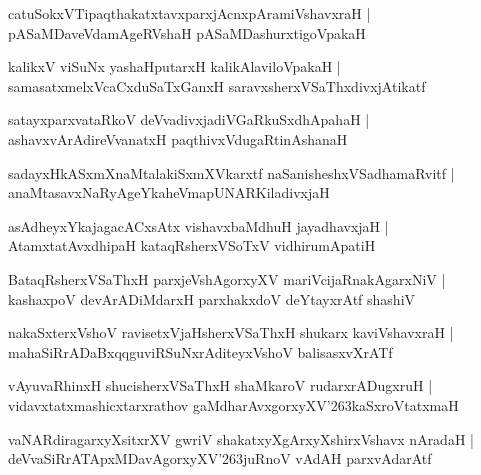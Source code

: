 \documentclass[twoside,12pt,openright]{book}
\def\S{\char'263}
\newcounter{shloka}[chapter]
\begin{document}
\begin{shloka}%
catuSokxVTipaqthakatxtavxparxjAcnxpAramiVshavxraH |\\
pASaMDaveVdamAgeRVshaH pASaMDashurxtigoVpakaH 
\end{shloka}

\begin{shloka}%
kalikxV viSuNx yashaHputarxH kalikAlaviloVpakaH |\\
samasatxmelxVcaCxduSaTxGanxH saravxsherxVSaThxdivxjAtikatf 
\end{shloka}

\begin{shloka}%
satayxparxvataRkoV deVvadivxjadiVGaRkuSxdhApahaH |\\
ashavxvArAdireVvanatxH paqthivxVdugaRtinAshanaH 
\end{shloka}

\begin{shloka}%
sadayxHkASxmXnaMtalakiSxmXVkarxtf naSanisheshxVSadhamaRvitf |\\
anaMtasavxNaRyAgeYkaheVmapUNARKiladivxjaH 
\end{shloka}

\begin{shloka}%
asAdheyxYkajagacACxsAtx vishavxbaMdhuH jayadhavxjaH |\\
AtamxtatAvxdhipaH kataqRsherxVSoTxV vidhirumApatiH 
\end{shloka}

\begin{shloka}%
BataqRsherxVSaThxH parxjeVshAgorxyXV mariVcijaRnakAgarxNiV |\\
kashaxpoV devArADiMdarxH parxhakxdoV deYtayxrAtf shashiV 
\end{shloka}

\begin{shloka}%
nakaSxterxVshoV ravisetxVjaHsherxVSaThxH shukarx kaviVshavxraH |\\
mahaSiRrADaBxqqguviRSuNxrAditeyxVshoV balisasxvXrATf
\end{shloka}

\begin{shloka}%
vAyuvaRhinxH shucisherxVSaThxH shaMkaroV rudarxrADugxruH |\\
vidavxtatxmashicxtarxrathov gaMdharAvxgorxyXV\S kaSxroVtatxmaH 
\end{shloka}

\begin{shloka}%
vaNARdiragarxyXsitxrXV gwriV shakatxyXgArxyXshirxVshavx nAradaH |\\
deVvaSiRrATApxMDavAgorxyXV\S juRnoV vAdAH parxvAdarAtf
\end{shloka}
\end{document}
